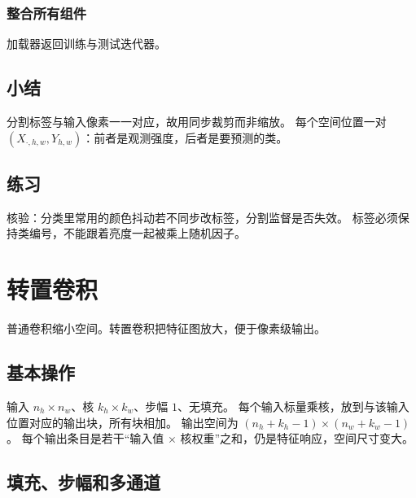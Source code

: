 \subsubsection{整合所有组件}

加载器返回训练与测试迭代器。

\subsection{小结}

分割标签与输入像素一一对应，故用同步裁剪而非缩放。
每个空间位置一对 $(X_{\cdot,h,w},Y_{h,w})$：前者是观测强度，后者是要预测的类。

\subsection{练习}

核验：分类里常用的颜色抖动若不同步改标签，分割监督是否失效。
标签必须保持类编号，不能跟着亮度一起被乘上随机因子。

\section{转置卷积}




普通卷积缩小空间。转置卷积把特征图放大，便于像素级输出。

\subsection{基本操作}

输入 $n_h\times n_w$、核 $k_h\times k_w$、步幅 $1$、无填充。
每个输入标量乘核，放到与该输入位置对应的输出块，所有块相加。
输出空间为 $(n_h+k_h-1)\times(n_w+k_w-1)$。
每个输出条目是若干“输入值 $\times$ 核权重”之和，仍是特征响应，空间尺寸变大。

\subsection{填充、步幅和多通道}

